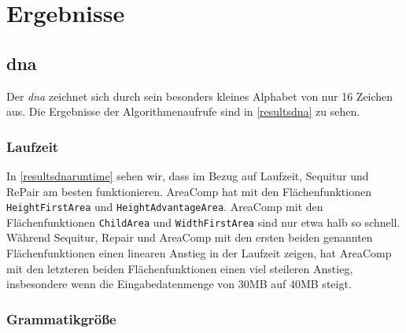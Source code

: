 \section{Ergebnisse}

\subsection{dna}

Der \emph{dna} zeichnet sich durch sein besonders kleines Alphabet von nur 16 Zeichen aus. Die Ergebnisse der Algorithmenaufrufe sind in \autoref{resultsdna} zu sehen. 

\subsubsection{Laufzeit}

In \autoref{resultsdnaruntime} sehen wir, dass im Bezug auf Laufzeit, Sequitur und RePair am besten funktionieren. AreaComp hat mit den Flächenfunktionen \texttt{HeightFirstArea} und \texttt{HeightAdvantageArea}. AreaComp mit den Flächenfunktionen \texttt{ChildArea} und \texttt{WidthFirstArea} sind nur etwa halb so schnell. 
Während Sequitur, Repair und AreaComp mit den ersten beiden genannten Flächenfunktionen einen linearen Anstieg in der Laufzeit zeigen, hat AreaComp mit den letzteren beiden Flächenfunktionen einen viel steileren Anstieg, insbesondere wenn die Eingabedatenmenge von $30$MB auf $40$MB steigt.

\subsubsection{Grammatikgröße}



